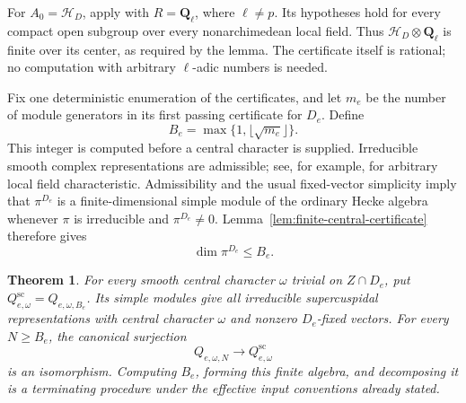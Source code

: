 \documentclass[10pt,letterpaper]{amsart}
\numberwithin{equation}{section}
\newtheorem{theorem}{Theorem}[section]
\theoremstyle{remark}
\begin{document}
For $A_0=\mathcal H_D$, apply
\cite[Theorem~1.1]{DHKM} with $R=\mathbf Q_\ell$, where
$\ell\ne p$. Its hypotheses hold for every compact open subgroup over
every nonarchimedean local field. Thus $\mathcal H_D\otimes\mathbf Q_\ell$
is finite over its center, as required by the lemma. The certificate
itself is rational; no computation with arbitrary $\ell$-adic numbers
is needed.

Fix one deterministic enumeration of the certificates, and let $m_e$ be
the number of module generators in its first passing certificate for
$D_e$. Define
\[
 B_e=\max\{1,\lfloor\sqrt{m_e}\rfloor\}.
\]
This integer is computed before a central character is supplied.
Irreducible smooth complex representations are admissible; see, for example,
\cite[Proposition~4.10(iv)]{HV} for arbitrary local field characteristic.
Admissibility and the usual fixed-vector simplicity imply that
$\pi^{D_e}$ is a finite-dimensional simple module of the ordinary
Hecke algebra whenever $\pi$ is irreducible and $\pi^{D_e}\ne0$.
Lemma~\ref{lem:finite-central-certificate} therefore gives
\begin{equation}\label{eq:certified-fixed-dimension-bound}
 \dim\pi^{D_e}\le B_e.
\end{equation}

\begin{theorem}\label{thm:certified-cuspidal-stabilization}
For every smooth central character $\omega$ trivial on $Z\cap D_e$,
put $Q^{\mathrm{sc}}_{e,\omega}=Q_{e,\omega,B_e}$. Its simple modules
give all irreducible supercuspidal representations with central character
$\omega$ and nonzero $D_e$-fixed vectors. For every $N\ge B_e$, the
canonical surjection
\[
 Q_{e,\omega,N}\longrightarrow Q^{\mathrm{sc}}_{e,\omega}
\]
is an isomorphism. Computing $B_e$, forming this finite algebra, and
decomposing it is a terminating procedure under the effective input
conventions already stated.
\end{theorem}
\end{document}
